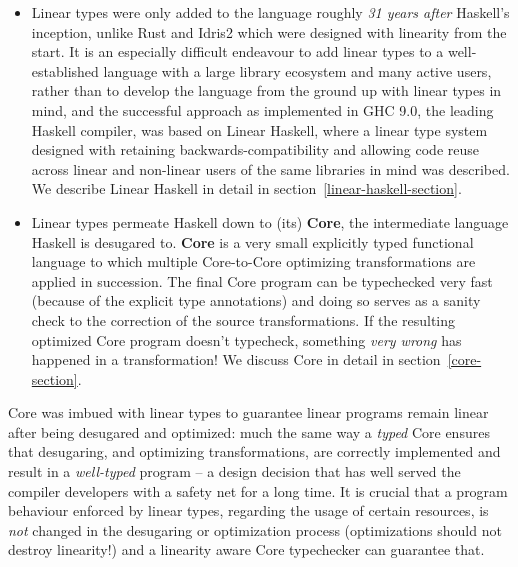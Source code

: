 \documentclass[]{lwnovathesis}
\begin{document}
\begin{itemize}
    \item Linear types were only added to the language roughly \emph{31 years
        after} Haskell's inception, unlike Rust and Idris2 which were
        designed with linearity from the start. It is an especially difficult
        endeavour to add linear types to a well-established language with a
        large library ecosystem and many active users, rather than to develop
        the language from the ground up with linear types in mind, and the
        successful approach as implemented in GHC 9.0, the leading Haskell
        compiler, was based on Linear Haskell\cite{linearhaskell}, where a
        linear type system designed with retaining backwards-compatibility and
        allowing code reuse across linear and non-linear users of the same
        libraries in mind was described. We describe Linear Haskell in detail in
        section~\ref{linear-haskell-section}.

    \item Linear types permeate Haskell down to (its) \textbf{Core}, the
        intermediate language Haskell is desugared to. \textbf{Core} is a very
        small explicitly typed functional language to which multiple
        Core-to-Core optimizing transformations are applied in succession. The
        final Core program can be typechecked very fast (because of the explicit
        type annotations) and doing so serves as a sanity check to the
        correction of the source transformations. If the resulting optimized
        Core program doesn't typecheck, something \emph{very wrong} has happened
        in a transformation!  We discuss Core in detail in
        section~\ref{core-section}.
\end{itemize}

Core was imbued with linear types to guarantee linear programs remain linear after being
desugared and optimized: much the same way a \emph{typed} Core ensures that
desugaring, and optimizing transformations, are correctly implemented and result
in a \emph{well-typed} program -- a design decision that has well served the
compiler developers with a safety net for a long time. It is crucial that a
program behaviour enforced by linear types, regarding the usage of certain
resources, is \emph{not} changed in the desugaring or optimization process
(optimizations should not destroy linearity!) and a linearity aware Core
typechecker can guarantee that.
\end{document}
